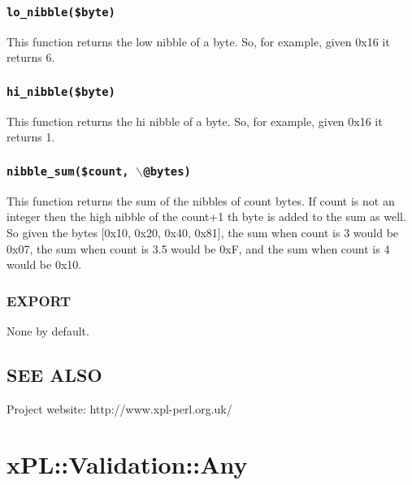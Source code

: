 \documentclass[12pt,a4paper]{article}
\begin{document}
\subsubsection*{\texttt{lo\_nibble(\$byte)}\label{xPL::Utils_lo_nibble_byte_}}


This function returns the low nibble of a byte.  So, for example, given
0x16 it returns 6.

\subsubsection*{\texttt{hi\_nibble(\$byte)}\label{xPL::Utils_hi_nibble_byte_}}


This function returns the hi nibble of a byte.  So, for example, given
0x16 it returns 1.

\subsubsection*{\texttt{nibble\_sum(\$count, $\backslash$@bytes)}\label{xPL::Utils_nibble_sum_count_backslash_bytes_}}


This function returns the sum of the nibbles of count bytes.  If count
is not an integer then the high nibble of the count+1 th byte is added
to the sum as well.  So given the bytes [0x10, 0x20, 0x40, 0x81], the
sum when count is 3 would be 0x07, the sum when count is 3.5 would be
0xF, and the sum when count is 4 would be 0x10.

\subsubsection*{EXPORT\label{xPL::Utils_EXPORT}}


None by default.

\subsection*{SEE ALSO\label{xPL::Utils_SEE_ALSO}}


Project website: http://www.xpl-perl.org.uk/

\newpage
\section{xPL::Validation::Any\label{xPL::Validation::Any}}
\end{document}
